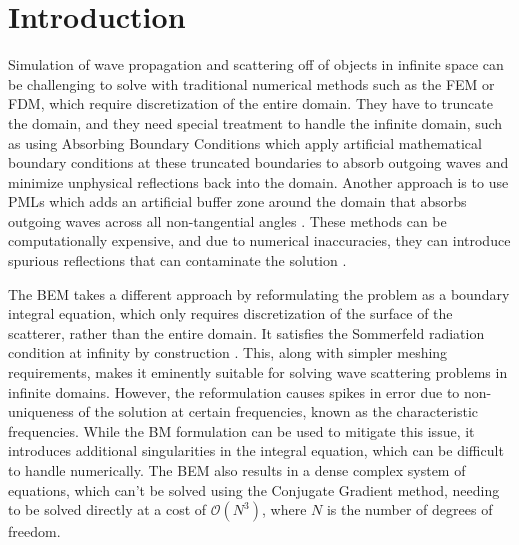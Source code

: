 
\chapter{Introduction}\label{chapter:introduction}

Simulation of wave propagation and scattering off of objects in infinite space can be challenging to solve with traditional numerical methods such as the \ac{FEM} or \ac{FDM}, which require discretization of the entire domain. They have to truncate the domain, and they need special treatment to handle the infinite domain, such as using Absorbing Boundary Conditions which apply artificial mathematical boundary conditions at these truncated boundaries to absorb outgoing waves and minimize unphysical reflections back into the domain. Another approach is to use \ac{PML}s which adds an artificial buffer zone around the domain that absorbs outgoing waves across all non-tangential angles \cite{hastingsapplicationperfectlymatched1996}. These methods can be computationally expensive, and due to numerical inaccuracies, they can introduce spurious reflections that can contaminate the solution \cite{gaoapplicationreflectionlessdiscrete2022} \cite{thompsonreviewfiniteelementmethods2006}.

The \ac{BEM} takes a different approach by reformulating the problem as a boundary integral equation, which only requires discretization of the surface of the scatterer, rather than the entire domain. It satisfies the Sommerfeld radiation condition at infinity by construction \cite{sommerfeldgreenschefunktionschwingungsgleichung1912}\cite{schoteightyyearssommerfelds1992}. This, along with simpler meshing requirements, makes it eminently suitable for solving wave scattering problems in infinite domains. However, the reformulation causes spikes in error due to non-uniqueness of the solution at certain frequencies, known as the characteristic frequencies. While the \ac{BM} formulation can be used to mitigate this issue, it introduces additional singularities in the integral equation, which can be difficult to handle numerically. The \ac{BEM} also results in a dense complex system of equations, which can't be solved using the Conjugate Gradient method, needing to be solved directly at a cost of $\mathcal{O}(N^3)$, where $N$ is the number of degrees of freedom. 

